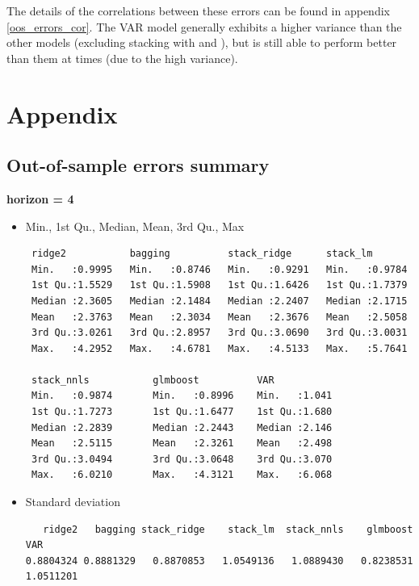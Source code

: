 The details of the correlations between these errors can be found in appendix \ref{oos_errors_cor}. The VAR model generally exhibits a higher variance than the other models (excluding stacking with  and ), but is still able to perform better than them at times (due to the high variance).

\newpage

\section{Appendix}

\subsection{Out-of-sample errors summary}
\label{boxplot_summary}

\textbf{horizon = 4}

\begin{itemize}

\item Min., 1st Qu., Median, Mean, 3rd Qu., Max

\begin{verbatim}
 ridge2           bagging          stack_ridge      stack_lm
 Min.   :0.9995   Min.   :0.8746   Min.   :0.9291   Min.   :0.9784
 1st Qu.:1.5529   1st Qu.:1.5908   1st Qu.:1.6426   1st Qu.:1.7379
 Median :2.3605   Median :2.1484   Median :2.2407   Median :2.1715
 Mean   :2.3763   Mean   :2.3034   Mean   :2.3676   Mean   :2.5058
 3rd Qu.:3.0261   3rd Qu.:2.8957   3rd Qu.:3.0690   3rd Qu.:3.0031
 Max.   :4.2952   Max.   :4.6781   Max.   :4.5133   Max.   :5.7641

 stack_nnls           glmboost          VAR
 Min.   :0.9874       Min.   :0.8996    Min.   :1.041
 1st Qu.:1.7273       1st Qu.:1.6477    1st Qu.:1.680
 Median :2.2839       Median :2.2443    Median :2.146
 Mean   :2.5115       Mean   :2.3261    Mean   :2.498
 3rd Qu.:3.0494       3rd Qu.:3.0648    3rd Qu.:3.070
 Max.   :6.0210       Max.   :4.3121    Max.   :6.068
\end{verbatim}

\item Standard deviation

\begin{verbatim}
   ridge2   bagging stack_ridge    stack_lm  stack_nnls    glmboost   VAR
0.8804324 0.8881329   0.8870853   1.0549136   1.0889430   0.8238531   1.0511201
\end{verbatim}

\end{itemize}

